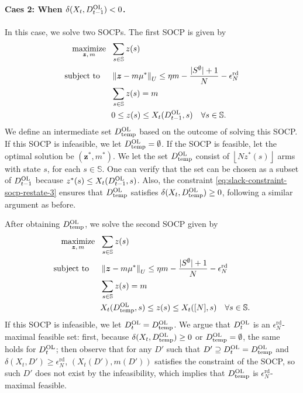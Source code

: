 \documentclass[11pt,letterpaper]{article}
\theoremstyle{plain}
\theoremstyle{definition}
\theoremstyle{remark}
\newcommand{\norm}[1]{\left\lVert#1\right\rVert}
\newcommand{\floor}[1]{\left\lfloor#1\right\rfloor}
\newcommand{\ve}[1]{\bm{#1}}
\newcommand{\sspa}{\mathbb{S}}
\newcommand{\sums}{\sum_{s\in\sspa}}
\newcommand{\sempty}{S^{\emptyset}}
\newcommand{\statdist}{\mu^*}
\newcommand{\umat}{U}
\newcommand{\errtol}{\epsilon_N^{\text{rd}}}
\newcommand{\Db}{D^{\textup{OL}}}
\newcommand{\Dtemp}{\Db_{\textup{temp}}}
\newcommand{\slk}{\delta}
\begin{document}
\paragraph{Caes 2: When $\slk(X_t, \Db_{t-1})<0$.} In this case,  we solve two SOCPs. 
The first SOCP is given by 
\begin{subequations}
\begin{align}
    \underset{\ve{z},\, m}{\text{maximize}}  \mspace{12mu}& \sums z(s) \\
    \text{subject to}\mspace{25mu}
    & \norm{\ve{z} - m \statdist}_{\umat} \leq  \eta m -  \frac{|\sempty|+1}{N} - \errtol  \label{eq:slack-constraint-socp-restate-3} \\
    & \sums z(s) = m \\
    &  0\leq z(s) \leq X_t(\Db_{t-1}, s) \quad \forall s\in\sspa.
\end{align}
\end{subequations}
We define an intermediate set $\Dtemp$ based on the outcome of solving this SOCP. If this SOCP is infeasible, we let $\Dtemp = \emptyset$. 
If the SOCP is feasible, let the optimal solution be $(\ve{z}^*, m^*)$. We let the set $\Dtemp$ consist of $\floor{Nz^*(s)}$ arms with state $s$, for each $s\in\sspa$. 
One can verify that the set can be chosen as a subset of $\Db_{t-1}$ because $z^*(s) \leq X_t(\Db_{t-1}, s)$. 
Also, the constraint \eqref{eq:slack-constraint-socp-restate-3} ensures that $\Dtemp$ satisfies $\slk(X_t, \Dtemp) \geq 0$, following a similar argument as before.

After obtaining $\Dtemp$, we solve the second SOCP given by
\begin{subequations}
\begin{align}
    \underset{\ve{z},\, m}{\text{maximize}}  \mspace{12mu}& \sums z(s) \\
    \text{subject to}\mspace{25mu}
    & \norm{\ve{z} - m \statdist}_{\umat} \leq  \eta m -  \frac{|\sempty|+1}{N} - \errtol  \label{eq:slack-constraint-socp-restate-4} \\
    & \sums z(s) = m \\
    &  X_t(\Dtemp, s) \leq z(s) \leq X_t([N], s) \quad \forall s\in\sspa.
\end{align}
\end{subequations}
If this SOCP is infeasible, we let $\Db_t = \Dtemp$. 
We argue that $\Db_t$ is an $\errtol$-maximal feasible set:
first, because $\slk(X_t, \Dtemp) \geq 0$ or $\Dtemp=\emptyset$, the same holds for $\Db_t$; 
then observe that for any $D'$ such that $D'\supseteq \Db_t = \Dtemp$ and $\slk(X_t, D') \geq \errtol$, $(X_t(D'), m(D'))$ satisfies the constraint of the SOCP, so such $D'$ does not exist by the infeasibility, which implies that $\Dtemp$ is $\errtol$-maximal feasible. 
\end{document}
